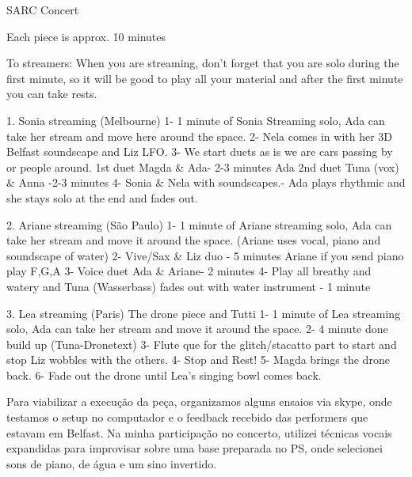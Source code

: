 \begin{citacao}


SARC Concert

Each piece is approx. 10 minutes

To streamers: When you are streaming, don’t forget that you are solo during the first minute, so it will be good to play all your material and after the first minute you can take rests. 



1. Sonia streaming (Melbourne) 
1- 1 minute of  Sonia Streaming solo, Ada can take her stream and move here around the space. 
2-  Nela comes in with her 3D Belfast soundscape and Liz LFO. 
3-  We start duets as is we are cars passing by or people around. 
    1st duet Magda \& Ada- 2-3 minutes Ada 
    2nd duet Tuna (vox) \& Anna -2-3 minutes 
4- Sonia \& Nela with soundscapes.- Ada plays rhythmic and she stays solo at the end and fades out. 


2. Ariane streaming (São Paulo) 
1- 1 minute of  Ariane streaming solo, Ada can take her stream and move it around the space. (Ariane uses vocal, piano and soundscape of water)
2- Vive/Sax \& Liz duo - 5 minutes 
Ariane if you send piano play F,G,A
3- Voice duet  Ada \& Ariane- 2 minutes 
4- Play all breathy and watery  and Tuna (Wasserbass) fades out with water instrument - 1 minute   

3. Lea streaming (Paris) The drone piece and Tutti 
1- 1 minute of  Lea streaming solo, Ada can take her stream and move it around the space. 
2- 4 minute done build up (Tuna-Dronetext)
3- Flute que for the glitch/stacatto part to start and stop
Liz wobbles with the others. 
4- Stop and Rest!
5- Magda brings the drone back.
6- Fade out the drone until Lea’s singing bowl comes back. 
\end{citacao}

Para viabilizar a execução da peça, organizamos alguns ensaios via skype, onde testamos o setup no computador e o feedback recebido das performers que estavam em Belfast. Na minha participação no concerto, utilizei técnicas vocais expandidas para improvisar sobre uma base preparada no PS, onde selecionei sons de piano, de água e um sino invertido. 


